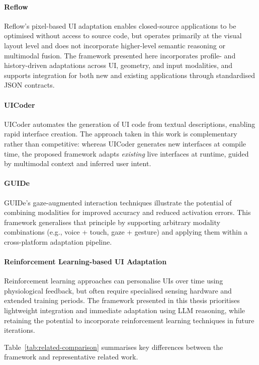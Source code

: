 \documentclass[openany]{book}
\begin{document}
\paragraph{Reflow \cite{Wu2024}}
Reflow’s pixel-based UI adaptation enables closed-source applications to be optimised without access to source code, but operates primarily at the visual layout level and does not incorporate higher-level semantic reasoning or multimodal fusion. The framework presented here incorporates profile- and history-driven adaptations across UI, geometry, and input modalities, and supports integration for both new and existing applications through standardised JSON contracts.

\paragraph{UICoder \cite{Wu2024}}
UICoder automates the generation of UI code from textual descriptions, enabling rapid interface creation. The approach taken in this work is complementary rather than competitive: whereas UICoder generates new interfaces at compile time, the proposed framework adapts \emph{existing} live interfaces at runtime, guided by multimodal context and inferred user intent.

\paragraph{GUIDe \cite{kumar2007guide}}
GUIDe’s gaze-augmented interaction techniques illustrate the potential of combining modalities for improved accuracy and reduced activation errors. This framework generalises that principle by supporting arbitrary modality combinations (e.g., voice + touch, gaze + gesture) and applying them within a cross-platform adaptation pipeline.

\paragraph{Reinforcement Learning-based UI Adaptation \cite{gaspar2023learning}}
Reinforcement learning approaches can personalise UIs over time using physiological feedback, but often require specialised sensing hardware and extended training periods. The framework presented in this thesis prioritises lightweight integration and immediate adaptation using LLM reasoning, while retaining the potential to incorporate reinforcement learning techniques in future iterations.

\medskip
Table~\ref{tab:related-comparison} summarises key differences between the framework and representative related work.
\end{document}
